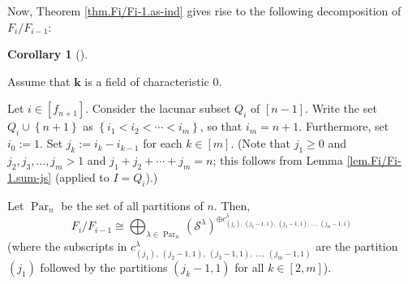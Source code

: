 \documentclass[numbers=enddot,12pt,final,onecolumn,notitlepage]{scrartcl}%
\theoremstyle{definition}
\newtheorem{coro}[theo]{Corollary}
\newenvironment{corollary}[1][]
{\begin{coro}[#1]\begin{leftbar}}
{\end{leftbar}\end{coro}}
\begin{document}
Now, Theorem \ref{thm.Fi/Fi-1.as-ind} gives rise to the following
decomposition of $F_{i}/F_{i-1}$:

\begin{corollary}
\label{cor.Fi/Fi-1.lr}Assume that $\mathbf{k}$ is a field of characteristic
$0$.

Let $i\in\left[  f_{n+1}\right]  $. Consider the lacunar subset $Q_{i}$ of
$\left[  n-1\right]  $. Write the set $Q_{i}\cup\left\{  n+1\right\}  $ as
$\left\{  i_{1}<i_{2}<\cdots<i_{m}\right\}  $, so that $i_{m}=n+1$.
Furthermore, set $i_{0}:=1$. Set $j_{k}:=i_{k}-i_{k-1}$ for each $k\in\left[
m\right]  $. (Note that $j_{1}\geq0$ and $j_{2},j_{3},\ldots,j_{m}>1$ and
$j_{1}+j_{2}+\cdots+j_{m}=n$; this follows from Lemma \ref{lem.Fi/Fi-1.sum-js}
(applied to $I=Q_{i}$).)

Let $\operatorname*{Par}\nolimits_{n}$ be the set of all partitions of $n$.
Then,%
\[
F_{i}/F_{i-1}\cong\bigoplus_{\lambda\in\operatorname*{Par}\nolimits_{n}%
}\left(  \mathcal{S}^{\lambda}\right)  ^{\oplus c_{\left(  j_{1}\right)
,\ \left(  j_{2}-1,1\right)  ,\ \left(  j_{3}-1,1\right)  ,\ \ldots,\ \left(
j_{m}-1,1\right)  }^{\lambda}}%
\]
(where the subscripts in $c_{\left(  j_{1}\right)  ,\ \left(  j_{2}%
-1,1\right)  ,\ \left(  j_{3}-1,1\right)  ,\ \ldots,\ \left(  j_{m}%
-1,1\right)  }^{\lambda}$ are the partition $\left(  j_{1}\right)  $ followed
by the partitions $\left(  j_{k}-1,1\right)  $ for all $k\in\left[
2,m\right]  $).
\end{corollary}
\end{document}
